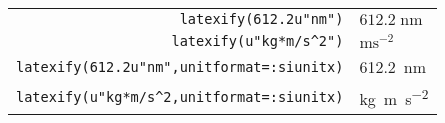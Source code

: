 \documentclass{standalone}
\begin{document}
\begin{tabular}{rl}
        \verb+latexify(612.2u"nm")+ & $612.2\;\mathrm{nm}$\\
        \verb+latexify(u"kg*m/s^2")+ & $\mathrm{m}\mathrm{s}^{-2}$\\
        \verb+latexify(612.2u"nm",unitformat=:siunitx)+ & \SI{612.2}{\nano\meter}\\
        \verb+latexify(u"kg*m/s^2,unitformat=:siunitx)+ & \si{\kilo\gram\meter\per\second\tothe{2}}\\
\end{tabular}
\end{document}
